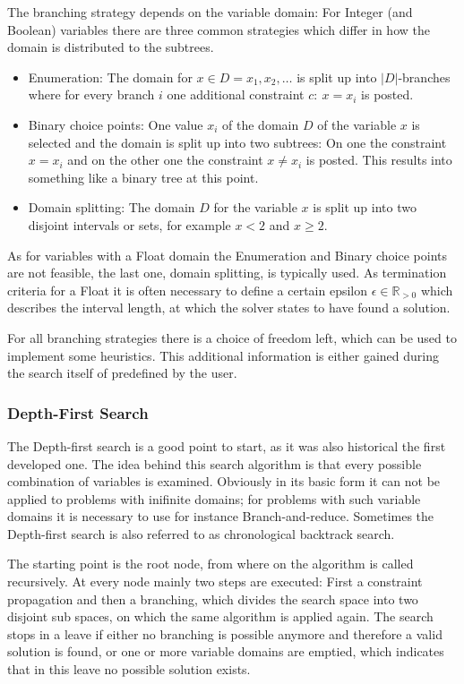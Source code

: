 \documentclass[10pt,
               a4paper,
               journal,
               ]{IEEEtran}
\begin{document}
	The branching strategy depends on the variable domain: For Integer (and Boolean) variables there are three common strategies \cite[p.~87]{handbookCP} which differ in how the domain is distributed to the subtrees.
	\begin{itemize}
	\item Enumeration: The domain for $x \in D = {x_1, x_2, \dots}$ is split up into $|D|$-branches where for every branch $i$ one additional constraint $c:\ x = x_i$ is posted.
	\item Binary choice points: One value $x_i$ of the domain $D$ of the variable $x$ is selected and the domain is split up into two subtrees: On one the constraint $x = x_i$ and on the other one the constraint $x \ne x_i$ is posted. This results into something like a binary tree at this point.
	\item Domain splitting: The domain $D$ for the variable $x$ is split up into two disjoint intervals or sets, for example $x < 2$ and $x \ge 2$.
	\end{itemize}
	
	As for variables with a Float domain the Enumeration and Binary choice points are not feasible, the last one, domain splitting, is typically used. As termination criteria for a Float it is often necessary to define a certain epsilon $\epsilon \in \mathbb{R}_{>0}$ which describes the interval length, at which the solver states to have found a solution.
	
	For all branching strategies there is a choice of freedom left, which can be used to implement some heuristics. This additional information is either gained during the search itself of predefined by the user.
	
	\subsubsection{Depth-First Search}
	The Depth-first search is a good point to start, as it was also historical the first developed one. The idea behind this search algorithm is that every possible combination of variables is examined. Obviously in its basic form it can not be applied to problems with inifinite domains; for problems with such variable domains it is necessary to use for instance Branch-and-reduce. Sometimes the Depth-first search is also referred to as chronological backtrack search.
	
	The starting point is the root node, from where on the algorithm is called recursively. At every node mainly two steps are executed: First a constraint propagation and then a branching, which divides the search space into two disjoint sub spaces, on which the same algorithm is applied again. The search stops in a leave if either no branching is possible anymore and therefore a valid solution is found, or one or more variable domains are emptied, which indicates that in this leave no possible solution exists.
	
\end{document}
